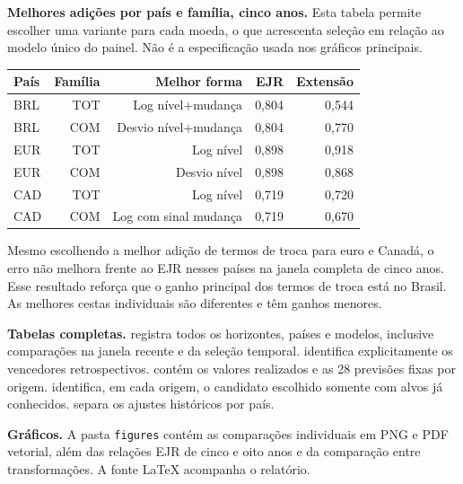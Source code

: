 \documentclass[10pt,a4paper]{article}
\begin{document}
\textbf{Melhores adições por país e família, cinco anos.} Esta tabela permite escolher uma variante para cada moeda, o que acrescenta seleção em relação ao modelo único do painel. Não é a especificação usada nos gráficos principais.

{\footnotesize
\begin{center}\begin{tabular}{lrrrr}\toprule
País & Família & Melhor forma & EJR & Extensão \\ \midrule
BRL & TOT & Log nível+mudança & 0,804 & 0,544 \\
BRL & COM & Desvio nível+mudança & 0,804 & 0,770 \\
EUR & TOT & Log nível & 0,898 & 0,918 \\
EUR & COM & Desvio nível & 0,898 & 0,868 \\
CAD & TOT & Log nível & 0,719 & 0,720 \\
CAD & COM & Log com sinal mudança & 0,719 & 0,670 \\\bottomrule\end{tabular}\end{center}}

Mesmo escolhendo a melhor adição de termos de troca para euro e Canadá, o erro não melhora frente ao EJR nesses países na janela completa de cinco anos. Esse resultado reforça que o ganho principal dos termos de troca está no Brasil. As melhores cestas individuais são diferentes e têm ganhos menores.

\textbf{Tabelas completas.}  registra todos os horizontes, países e modelos, inclusive comparações na janela recente e da seleção temporal.  identifica explicitamente os vencedores retrospectivos.  contém os valores realizados e as 28 previsões fixas por origem.  identifica, em cada origem, o candidato escolhido somente com alvos já conhecidos.  separa os ajustes históricos por país.

\textbf{Gráficos.} A pasta \texttt{figures} contém as comparações individuais em PNG e PDF vetorial, além das relações EJR de cinco e oito anos e da comparação entre transformações. A fonte LaTeX acompanha o relatório.
\end{document}
